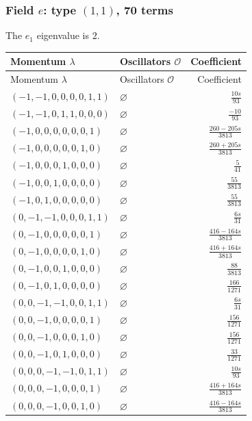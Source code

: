\subsubsection{\texorpdfstring{Field $e$: type $(1,1)$, 70 terms}{Field e: type (1,1), 70 terms}}
The $e_1$ eigenvalue is $2$. 
\begingroup\scriptsize\setlength{\tabcolsep}{3pt}\renewcommand{\arraystretch}{1.35}
\begin{longtable}{@{}llr@{}}
\toprule Momentum $\lambda$&Oscillators $\mathcal O$&Coefficient\\\midrule\endfirsthead
\toprule Momentum $\lambda$&Oscillators $\mathcal O$&Coefficient\\\midrule\endhead
\bottomrule\endfoot
$(-1,-1,0,0,0,0,1,1)$ & $\varnothing$ & $\frac{10s}{93}$\\
$(-1,-1,0,1,1,0,0,0)$ & $\varnothing$ & $\frac{-10}{93}$\\
$(-1,0,0,0,0,0,0,1)$ & $\varnothing$ & $\frac{260-205s}{3813}$\\
$(-1,0,0,0,0,0,1,0)$ & $\varnothing$ & $\frac{260+205s}{3813}$\\
$(-1,0,0,0,1,0,0,0)$ & $\varnothing$ & $\frac{5}{41}$\\
$(-1,0,0,1,0,0,0,0)$ & $\varnothing$ & $\frac{55}{3813}$\\
$(-1,0,1,0,0,0,0,0)$ & $\varnothing$ & $\frac{55}{3813}$\\
$(0,-1,-1,0,0,0,1,1)$ & $\varnothing$ & $\frac{6s}{31}$\\
$(0,-1,0,0,0,0,0,1)$ & $\varnothing$ & $\frac{416-164s}{3813}$\\
$(0,-1,0,0,0,0,1,0)$ & $\varnothing$ & $\frac{416+164s}{3813}$\\
$(0,-1,0,0,1,0,0,0)$ & $\varnothing$ & $\frac{88}{3813}$\\
$(0,-1,0,1,0,0,0,0)$ & $\varnothing$ & $\frac{166}{1271}$\\
$(0,0,-1,-1,0,0,1,1)$ & $\varnothing$ & $\frac{6s}{31}$\\
$(0,0,-1,0,0,0,0,1)$ & $\varnothing$ & $\frac{156}{1271}$\\
$(0,0,-1,0,0,0,1,0)$ & $\varnothing$ & $\frac{156}{1271}$\\
$(0,0,-1,0,1,0,0,0)$ & $\varnothing$ & $\frac{33}{1271}$\\
$(0,0,0,-1,-1,0,1,1)$ & $\varnothing$ & $\frac{10s}{93}$\\
$(0,0,0,-1,0,0,0,1)$ & $\varnothing$ & $\frac{416+164s}{3813}$\\
$(0,0,0,-1,0,0,1,0)$ & $\varnothing$ & $\frac{416-164s}{3813}$\\

\end{longtable}
